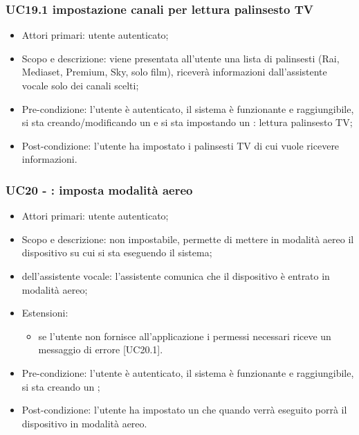 \subsubsection{UC19.1 impostazione canali per lettura palinsesto TV}
\begin{itemize}
	\item  Attori primari: utente autenticato;
	\item  Scopo e descrizione: viene presentata all'utente una lista di palinsesti (Rai, Mediaset, Premium, Sky, solo film), riceverà informazioni dall'assistente vocale solo dei canali scelti;
	\item  Pre-condizione: l'utente è autenticato, il sistema è funzionante e raggiungibile, si sta creando/modificando un  e si sta impostando un : lettura palinsesto TV;
	\item  Post-condizione: l'utente ha impostato i palinsesti TV di cui vuole ricevere informazioni.
\end{itemize}
\subsubsection{UC20 - : imposta modalità aereo}
\begin{itemize}
	\item  Attori primari: utente autenticato;
	\item  Scopo e descrizione:  non impostabile, permette di mettere in modalità aereo il dispositivo  su cui si sta eseguendo il sistema;
	\item  {} dell'assistente vocale: l'assistente comunica che il dispositivo è entrato in modalità aereo;
	\item  Estensioni: 
		   \begin{itemize}
				\item se l'utente non fornisce all'applicazione i permessi necessari riceve un messaggio di errore [UC20.1].
		   \end{itemize}
	\item  Pre-condizione: l'utente è autenticato, il sistema è funzionante e raggiungibile, si sta creando un ;
	\item  Post-condizione: l'utente ha impostato un  che quando verrà eseguito porrà il dispositivo  in modalità aereo.
\end{itemize}
